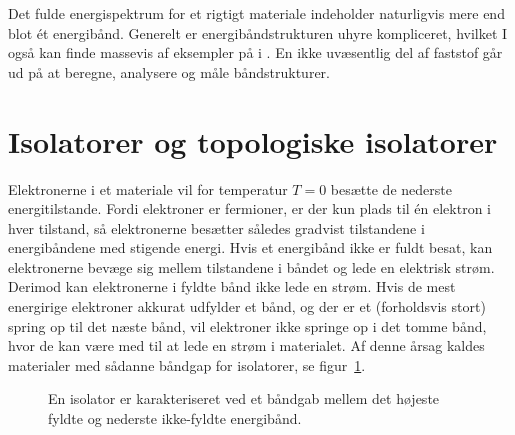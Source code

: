 \documentclass[11pt, a4paper]{article}
\begin{document}
Det fulde energispektrum for et rigtigt materiale indeholder
naturligvis mere end blot ét energibånd. Generelt er
energibåndstrukturen uhyre kompliceret, hvilket I også kan finde
massevis af eksempler på i \cite{gp}. En ikke uvæsentlig del af
faststof går ud på at beregne, analysere og måle båndstrukturer.

\section{Isolatorer og topologiske isolatorer}

Elektronerne i et materiale vil for temperatur $T=0$ besætte
de nederste energitilstande. Fordi elektroner er fermioner, er der kun
plads til én elektron i hver tilstand, så elektronerne besætter
således gradvist tilstandene i energibåndene med stigende energi. Hvis
et energibånd ikke er fuldt besat, kan elektronerne bevæge sig mellem
tilstandene i båndet og lede en elektrisk strøm. Derimod kan
elektronerne i fyldte bånd ikke lede en strøm. Hvis de mest energirige
elektroner akkurat udfylder et bånd, og der er et (forholdsvis stort)
spring op til det næste bånd, vil elektroner ikke springe op i det
tomme bånd, hvor de kan være med til at lede en strøm i materialet. Af
denne årsag kaldes materialer med sådanne båndgap for isolatorer, se
figur~\ref{fig:isolator}.

\begin{figure}[htbp]
  \centering
  \caption{En isolator er karakteriseret ved et båndgab mellem det
    højeste fyldte og nederste ikke-fyldte energibånd.}
  \label{fig:isolator}
\end{figure}
\end{document}
